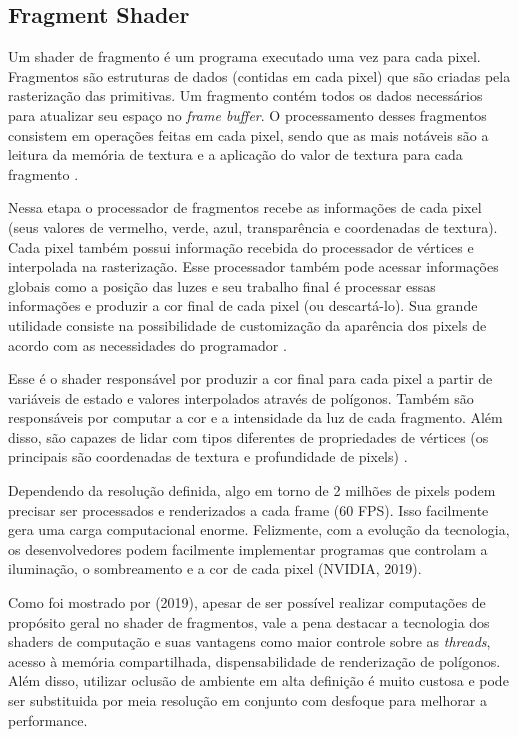 \subsection{Fragment Shader}
\label{sec:fragment-shader}

Um shader de fragmento é um programa executado uma vez para cada pixel. Fragmentos são estruturas de dados (contidas em cada pixel) que são criadas pela rasterização das primitivas. Um fragmento contém todos os dados necessários para atualizar seu espaço no \textit{frame buffer}. O processamento desses fragmentos consistem em operações feitas em cada pixel, sendo que as mais notáveis são a leitura da memória de textura e a aplicação do valor de textura para cada fragmento \cite{GLSLBook}. 

Nessa etapa o processador de fragmentos recebe as informações de cada pixel (seus valores de vermelho, verde, azul, transparência e coordenadas de textura). Cada pixel também possui informação recebida do processador de vértices e interpolada na rasterização. Esse processador também pode acessar informações globais como a posição das luzes e seu trabalho final é processar essas informações e produzir a cor final de cada pixel (ou descartá-lo). Sua grande utilidade consiste na possibilidade de customização da aparência dos pixels de acordo com as necessidades do programador \cite{bailey2007}. 

Esse é o shader responsável por produzir a cor final para cada pixel a partir de variáveis de estado e valores interpolados através de polígonos. Também são responsáveis por computar a cor e a intensidade da luz de cada fragmento. Além disso, são capazes de lidar com tipos diferentes de propriedades de vértices (os principais são coordenadas de textura e profundidade de pixels) \cite{hasu2018modern}. 

Dependendo da resolução definida, algo em torno de 2 milhões de pixels podem precisar ser processados e renderizados a cada frame (60 FPS). Isso facilmente gera uma carga computacional enorme. Felizmente, com a evolução da tecnologia, os desenvolvedores podem facilmente implementar programas que controlam a iluminação, o sombreamento e a cor de cada pixel (NVIDIA, 2019)\nocite{fragShader}.

Como foi mostrado por  (2019), apesar de ser possível realizar computações de propósito geral no shader de fragmentos, vale a pena destacar a tecnologia dos shaders de computação e suas vantagens como maior controle sobre as \textit{threads}, acesso à memória compartilhada, dispensabilidade de renderização de polígonos. Além disso, utilizar oclusão de ambiente em alta definição é muito custosa e pode ser substituida por meia resolução em conjunto com desfoque para melhorar a performance.

